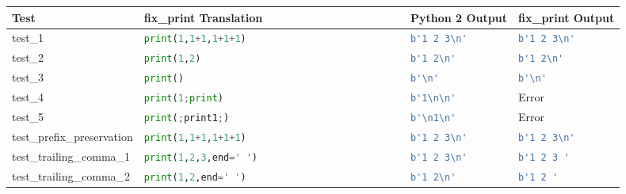 \begin{table}[ht]
    \begin{tabular}{@{}l|lll@{}}
    \toprule
    Test                                  & fix\_print Translation                        & Python 2 Output                        & fix\_print Output             \\ \midrule
    test\_1                               & \lstinline[language=Python, style=pythonstyle]|print(1,1+1,1+1+1)                           | & \lstinline[language=Python, style=pythonstyle]|b'1 2 3\n'   |           & \lstinline[language=Python, style=pythonstyle]|b'1 2 3\n'    | \\
    test\_2                               & \lstinline[language=Python, style=pythonstyle]|print(1,2)                                   | & \lstinline[language=Python, style=pythonstyle]|b'1 2\n'  |              & \lstinline[language=Python, style=pythonstyle]|b'1 2\n'      | \\
    test\_3                               & \lstinline[language=Python, style=pythonstyle]|print()                                      | & \lstinline[language=Python, style=pythonstyle]|b'\n'   |                & \lstinline[language=Python, style=pythonstyle]|b'\n'         | \\
    test\_4                               & \lstinline[language=Python, style=pythonstyle]|print(1;print)                               | & \lstinline[language=Python, style=pythonstyle]|b'1\n\n'| & Error                         \\
    test\_5                               & \lstinline[language=Python, style=pythonstyle]|print(;print1;)                              | & \lstinline[language=Python, style=pythonstyle]|b'\n1\n'| & Error                         \\
    test\_prefix\_preservation            & \lstinline[language=Python, style=pythonstyle]|print(1,1+1,1+1+1)                           | & \lstinline[language=Python, style=pythonstyle]|b'1 2 3\n' |             & \lstinline[language=Python, style=pythonstyle]|b'1 2 3\n'    | \\
    test\_trailing\_comma\_1              & \lstinline[language=Python, style=pythonstyle]|print(1,2,3,end=' ')                         | & \lstinline[language=Python, style=pythonstyle]|b'1 2 3\n'  |            & \lstinline[language=Python, style=pythonstyle]|b'1 2 3 '     |                \\
    test\_trailing\_comma\_2              & \lstinline[language=Python, style=pythonstyle]|print(1,2,end=' ')                           | & \lstinline[language=Python, style=pythonstyle]|b'1 2\n'   |             & \lstinline[language=Python, style=pythonstyle]|b'1 2 '       |                \\

\end{tabular}
\end{table}
